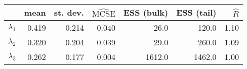 \begin{tabular}{lrrrrrr}
\toprule
{} &   mean &  st. dev. &  $\widehat{\mathrm{MCSE}}$ &  ESS (bulk) &  ESS (tail) &  $\widehat{R}$ \\
\midrule
$\lambda_1$ &  0.419 &     0.214 &                      0.040 &        26.0 &       120.0 &           1.10 \\
$\lambda_2$ &  0.320 &     0.204 &                      0.039 &        29.0 &       260.0 &           1.09 \\
$\lambda_3$ &  0.262 &     0.177 &                      0.004 &      1612.0 &      1462.0 &           1.00 \\
\bottomrule
\end{tabular}

